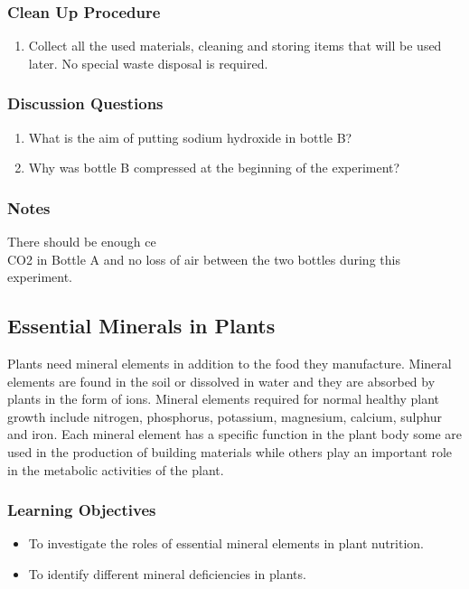\subsubsection*{Clean Up Procedure}
\begin{enumerate}
\item{Collect all the used materials, cleaning and storing items that will be used later. No special waste disposal is required.}
\end{enumerate}

\subsubsection*{Discussion Questions}
\begin{enumerate}
\item{What is the aim of putting sodium hydroxide in bottle B?}
\item{Why was bottle B compressed at the beginning of the experiment?}
\end{enumerate}

\subsubsection*{Notes}
There should be enough ce\\{CO2} in Bottle A and no loss of air between the two bottles during this experiment.

\subsection{Essential Minerals in Plants}
Plants need mineral elements in addition to the food they manufacture. Mineral elements are found in the soil or dissolved in water and they are absorbed by plants in the form of ions. Mineral elements required for normal healthy plant growth include nitrogen, phosphorus, potassium, magnesium, calcium, sulphur and iron. Each mineral element has a specific function in the plant body some are used in the production of building materials while others play an important role in the metabolic activities of the plant.

\subsubsection*{Learning Objectives}
\begin{itemize}
\item{To investigate the roles of essential mineral elements in plant nutrition.}
\item{To identify different mineral deficiencies in plants.}
\end{itemize}

